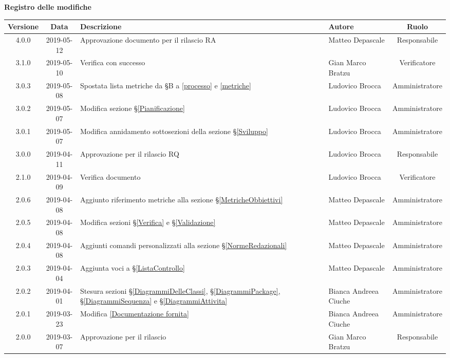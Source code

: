 \begin{center}
	\textbf{Registro delle modifiche}
	\end{center}
	\begin{center}
		\begin{tabularx}{\textwidth}{|c|c|X|X|c|}
			\hline
			\textbf{Versione} & \textbf{Data} & \textbf{Descrizione} & \textbf{Autore} & \textbf{Ruolo} \\ 
			\hline
			4.0.0 & 2019-05-12 & Approvazione documento per il rilascio RA & Matteo Depascale & Responsabile \\ 
			\hline
			3.1.0 & 2019-05-10 & Verifica con successo & Gian Marco Bratzu & Verificatore \\ 
			\hline
			3.0.3 & 2019-05-08 & Spostata lista metriche da \S B a \ref{processo} e \ref{metriche} & Ludovico Brocca & Amministratore \\ 
			\hline
			3.0.2 & 2019-05-07 & Modifica sezione \S\ref{Pianificazione} & Ludovico Brocca & Amministratore \\
			\hline
			3.0.1 & 2019-05-07 & Modifica annidamento sottosezioni della sezione \S\ref{Sviluppo} & Ludovico Brocca & Amministratore \\
			\hline
			3.0.0 & 2019-04-11 & Approvazione per il rilascio RQ & Ludovico Brocca & Responsabile \\
			\hline
			2.1.0 & 2019-04-09 & Verifica documento & Ludovico Brocca & Verificatore \\
			\hline
			2.0.6 & 2019-04-08 & Aggiunto riferimento metriche alla sezione \S\ref{MetricheObbiettivi} &Matteo Depascale & Amministratore \\
			\hline 
			2.0.5 & 2019-04-08 & Modifica sezioni \S\ref{Verifica}  e \S\ref{Validazione} & Matteo Depascale & Amministratore \\
			\hline
			2.0.4 & 2019-04-08 & Aggiunti comandi personalizzati alla sezione \S\ref{NormeRedazionali} &Matteo Depascale & Amministratore \\
			\hline
			2.0.3 & 2019-04-04 & Aggiunta voci a \S\ref{ListaControllo} & Matteo Depascale & Amministratore \\
			\hline
			2.0.2 & 2019-04-01 & Stesura sezioni \S\ref{DiagrammiDelleClassi}, \S\ref{DiagrammiPackage}, \S\ref{DiagrammiSequenza} e \S\ref{DiagrammiAttivita}  & Bianca Andreea Ciuche & Amministratore \\
			\hline
			2.0.1 & 2019-03-23 & Modifica \ref{Documentazione fornita} & Bianca Andreea Ciuche & Amministratore \\
			\hline
			2.0.0 &2019-03-07 & Approvazione per il rilascio & Gian Marco Bratzu& Responsabile\\

\end{tabularx}
\end{center}
